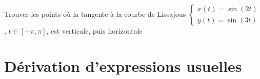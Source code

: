 \begin{frame}
\begin{exemple}
Trouver les points où la tangente à la courbe de Lissajous 
$\left\{
\begin{array}{l}
x(t)=\sin(2t)\\
y(t)=\sin(3t)
\end{array}
\right.$, $t\in [-\pi,\pi]$,
est verticale, puis horizontale

\begin{minipage}{0.55\textwidth}
\begin{itemize}
\end{itemize}  
\end{minipage}
\begin{minipage}{0.39\textwidth}
\vspace*{4ex}
\end{minipage}

\vspace*{-2ex}

\end{exemple}
	
\end{frame}

\section{Dérivation d'expressions usuelles}

